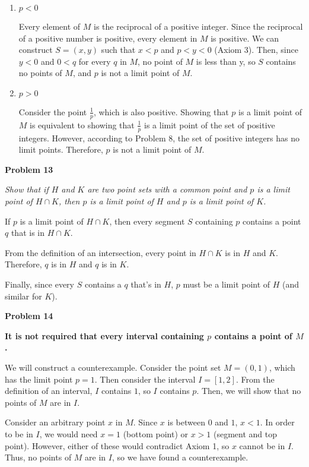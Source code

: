 \documentclass{article}
\begin{document}
\begin{enumerate}
\item
$p < 0$

Every element of $M$ is the reciprocal of a positive integer. Since the reciprocal of a positive number is positive, every element in $M$ is positive. We can construct $S = (x, y)$ such that $x < p$ and $p < y < 0$ (Axiom 3). Then, since $y < 0$ and $0 < q$ for every $q$ in $M$, no point of $M$ is less than y, so $S$ contains no points of $M$, and $p$ is not a limit point of $M$.

\item
$p > 0$

Consider the point $\frac{1}{p}$, which is also positive. Showing that $p$ is a limit point of $M$ is equivalent to showing that $\frac{1}{p}$ is a limit point of the set of positive integers. However, according to Problem 8, the set of positive integers has no limit points. Therefore, $p$ is not a limit point of $M$.
\end{enumerate}
\vspace{10pt}

\textbf{Problem 13}

\textit{Show that if $H$ and $K$ are two point sets with a common point and $p$ is a limit point of $H \cap K$, then $p$ is a limit point of $H$ and $p$ is a limit point of $K$.}

If $p$ is a limit point of $H \cap K$, then every segment $S$ containing $p$ contains a point $q$ that is in $H \cap K$.

From the definition of an intersection, every point in $H \cap K$ is in $H$ and $K$. Therefore, $q$ is in $H$ and $q$ is in $K$.

Finally, since every $S$ contains a $q$ that's in $H$, $p$ must be a limit point of $H$ (and similar for $K$).
\vspace{10pt}


\textbf{Problem 14}

\textbf{It is not required that every interval containing $p$ contains a point of $M$.}

We will construct a counterexample. Consider the point set $M = (0, 1)$, which has the limit point $p = 1$. Then consider the interval $I = [1, 2]$. From the definition of an interval, $I$ contains $1$, so $I$ contains $p$. Then, we will show that no points of $M$ are in $I$. 

Consider an arbitrary point $x$ in $M$. Since $x$ is between $0$ and $1$, $x < 1$. In order to be in $I$, we would need $x = 1$ (bottom point) or $x > 1$ (segment and top point). However, either of these would contradict Axiom 1, so $x$ cannot be in $I$. Thus, no points of $M$ are in $I$, so we have found a counterexample.
\vspace{10pt}
\end{document}
